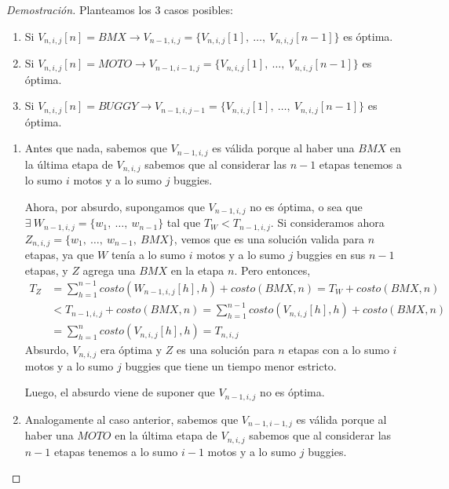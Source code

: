     \begin{proof}[Demostración]
        Planteamos los 3 casos posibles:
        \begin{enumerate}
            \item Si $V_{n,i,j}[n] = BMX \rightarrow V_{n-1,i,j} = \{V_{n,i,j}[1],\ \dots,\ V_{n,i,j}[n-1]\}$ es óptima.
            \item Si $V_{n,i,j}[n] = MOTO \rightarrow V_{n-1,i-1,j} = \{V_{n,i,j}[1],\ \dots,\ V_{n,i,j}[n-1]\}$ es óptima.
            \item Si $V_{n,i,j}[n] = BUGGY \rightarrow V_{n-1,i,j-1} = \{V_{n,i,j}[1],\ \dots,\ V_{n,i,j}[n-1]\}$ es óptima.
        \end{enumerate}

        \begin{enumerate}
            \item Antes que nada, sabemos que $V_{n-1,i,j}$ es válida porque al haber una $BMX$ en la última etapa de $V_{n,i,j}$ sabemos que al considerar las $n-1$ etapas tenemos a lo sumo $i$ motos y a lo sumo $j$ buggies.

            Ahora, por absurdo, supongamos que $V_{n-1,i,j}$ no es óptima, o sea que $\exists\ W_{n-1,i,j} = \{w_1,\ \dots,\ w_{n-1}\}$ tal que $T_{W} < T_{n-1,i,j}$.
            Si consideramos ahora $Z_{n,i,j} = \{w_1,\ \dots,\ w_{n-1},\ BMX\}$, vemos que es una solución valida para $n$ etapas, ya que $W$ tenía a lo sumo $i$ motos y a lo sumo $j$ buggies en sus $n-1$ etapas, y $Z$ agrega una $BMX$ en la etapa $n$.
            Pero entonces,
            \begin{equation*}
                \begin{aligned}
                    T_{Z} &= \sum_{h=1}^{n-1}{costo(W_{n-1,i,j}[h], h)} + costo(BMX,n) = T_{W} + costo(BMX,n) \\
                          &< T_{n-1,i,j} + costo(BMX,n) = \sum_{h=1}^{n-1}{costo(V_{n,i,j}[h], h)} + costo(BMX,n) \\
                          &= \sum_{h=1}^{n}{costo(V_{n,i,j}[h], h)} = T_{n,i,j}
                \end{aligned}
            \end{equation*}
            Absurdo, $V_{n,i,j}$ era óptima y $Z$ es una solución para $n$ etapas con a lo sumo $i$ motos y a lo sumo $j$ buggies que tiene un tiempo menor estricto.

            Luego, el absurdo viene de suponer que $V_{n-1,i,j}$ no es óptima.
            \item Analogamente al caso anterior, sabemos que $V_{n-1,i-1,j}$ es válida porque al haber una $MOTO$ en la última etapa de $V_{n,i,j}$ sabemos que al considerar las $n-1$ etapas tenemos a lo sumo $i-1$ motos y a lo sumo $j$ buggies.


\end{enumerate}
\end{proof}
